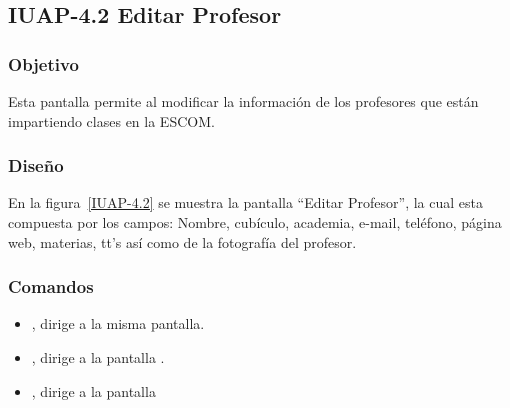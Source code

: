 \subsection{IUAP-4.2  Editar  Profesor}

\subsubsection{Objetivo}

	
    Esta pantalla permite al   modificar la información de los profesores que están impartiendo clases en la ESCOM.
\subsubsection{Diseño}


    En la figura~\ref{IUAP-4.2} se muestra la pantalla ``Editar Profesor'', la cual esta compuesta por los campos: Nombre, cubículo, academia, e-mail, teléfono, página web, materias, tt's así como de la fotografía del profesor.



\subsubsection{Comandos}
    \begin{itemize}
	\item {}, dirige a la misma pantalla.
	\item {}, dirige a la pantalla .
	\item {}, dirige a la pantalla 
    \end{itemize}
